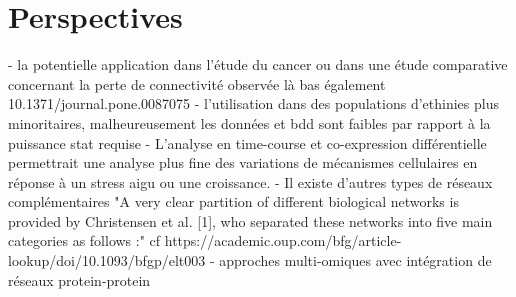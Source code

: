 \section{Perspectives}


- la potentielle application dans l'étude du cancer ou dans une étude comparative concernant la perte de connectivité observée là bas également 10.1371/journal.pone.0087075
- l'utilisation dans des populations d'ethinies plus minoritaires, malheureusement les données et bdd sont faibles par rapport à la puissance stat requise
- L'analyse en time-course et co-expression différentielle permettrait une analyse plus fine des variations de mécanismes cellulaires en réponse à un stress aigu ou une croissance. %
- Il existe d'autres types de réseaux complémentaires "A very clear partition of different biological networks is provided by Christensen et al. [1], who separated these networks into five main categories as follows :" cf https://academic.oup.com/bfg/article-lookup/doi/10.1093/bfgp/elt003
- approches multi-omiques avec intégration de réseaux protein-protein %



